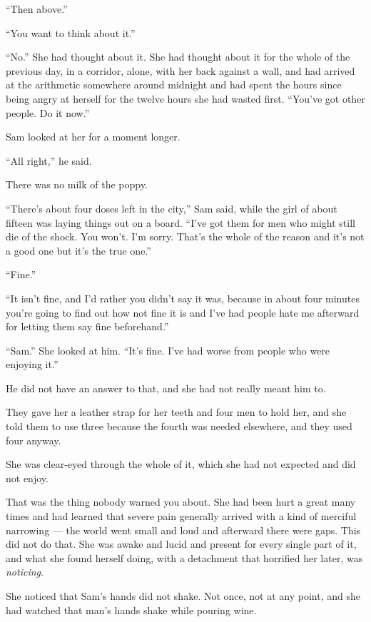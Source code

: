 “Then above.”

“You want to think about it.”

“No.” She had thought about it. She had thought about it for the whole of the previous day, in a corridor, alone, with her back against a wall, and had arrived at the arithmetic somewhere around midnight and had spent the hours since being angry at herself for the twelve hours she had wasted first. “You’ve got other people. Do it now.”

Sam looked at her for a moment longer.

“All right,” he said.

\sceneBreak

There was no milk of the poppy.

“There’s about four doses left in the city,” Sam said, while the girl of about fifteen was laying things out on a board. “I’ve got them for men who might still die of the shock. You won’t. I’m sorry. That’s the whole of the reason and it’s not a good one but it’s the true one.”

“Fine.”

“It isn’t fine, and I’d rather you didn’t say it was, because in about four minutes you’re going to find out how not fine it is and I’ve had people hate me afterward for letting them say fine beforehand.”

“Sam.” She looked at him. “It’s fine. I’ve had worse from people who were enjoying it.”

He did not have an answer to that, and she had not really meant him to.

They gave her a leather strap for her teeth and four men to hold her, and she told them to use three because the fourth was needed elsewhere, and they used four anyway.

\sceneBreak

She was clear-eyed through the whole of it, which she had not expected and did not enjoy.

That was the thing nobody warned you about. She had been hurt a great many times and had learned that severe pain generally arrived with a kind of merciful narrowing — the world went small and loud and afterward there were gaps. This did not do that. She was awake and lucid and present for every single part of it, and what she found herself doing, with a detachment that horrified her later, was \textit{noticing}.

She noticed that Sam’s hands did not shake. Not once, not at any point, and she had watched that man’s hands shake while pouring wine.

